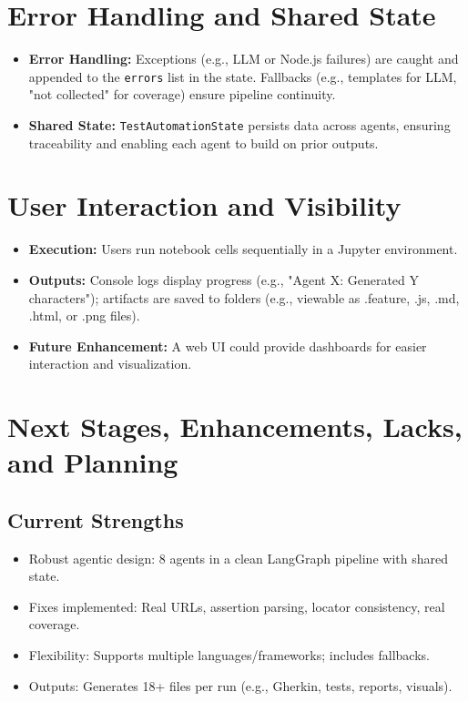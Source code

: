 \documentclass{article}
\begin{document}
\section{Error Handling and Shared State}
\begin{itemize}
    \item \textbf{Error Handling:} Exceptions (e.g., LLM or Node.js failures) are caught and appended to the \texttt{errors} list in the state. Fallbacks (e.g., templates for LLM, "not collected" for coverage) ensure pipeline continuity.
    \item \textbf{Shared State:} \texttt{TestAutomationState} persists data across agents, ensuring traceability and enabling each agent to build on prior outputs.
\end{itemize}

\section{User Interaction and Visibility}
\begin{itemize}
    \item \textbf{Execution:} Users run notebook cells sequentially in a Jupyter environment.
    \item \textbf{Outputs:} Console logs display progress (e.g., "Agent X: Generated Y characters"); artifacts are saved to folders (e.g., viewable as .feature, .js, .md, .html, or .png files).
    \item \textbf{Future Enhancement:} A web UI could provide dashboards for easier interaction and visualization.
\end{itemize}

\section{Next Stages, Enhancements, Lacks, and Planning}
\subsection{Current Strengths}
\begin{itemize}
    \item Robust agentic design: 8 agents in a clean LangGraph pipeline with shared state.
    \item Fixes implemented: Real URLs, assertion parsing, locator consistency, real coverage.
    \item Flexibility: Supports multiple languages/frameworks; includes fallbacks.
    \item Outputs: Generates 18+ files per run (e.g., Gherkin, tests, reports, visuals).
\end{itemize}
\end{document}
